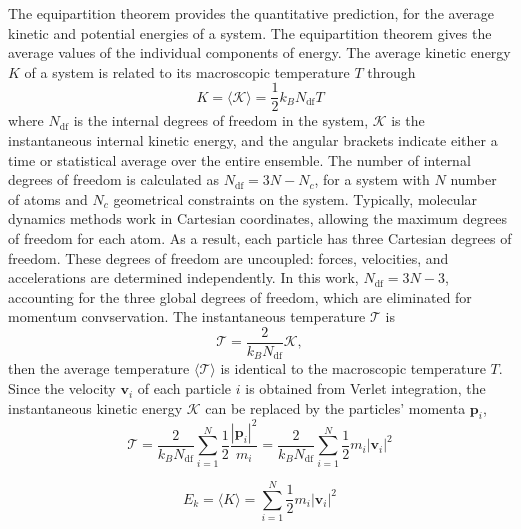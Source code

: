 The equipartition theorem provides the quantitative prediction, for the average kinetic and potential energies of a system.  The equipartition theorem gives the average values of the individual components of energy.  The average kinetic energy $K$ of a system is related to its macroscopic temperature $T$ through
\begin{equation}
  K
  =
  \langle \mathcal{K} \rangle
  =
  \frac{1}
       {2}
  k_B N_{\mathrm{df}} T
\end{equation}
where $N_{\mathrm{df}}$ is the internal degrees of freedom in the system, $\mathcal{K}$ is the instantaneous internal kinetic energy, and the angular brackets indicate either a time or statistical average over the entire ensemble.
The number of internal degrees of freedom is calculated as $N_{\mathrm{df}} = 3 N - N_c$, for a system with $N$ number of atoms and $N_c$ geometrical constraints on the system.  Typically, molecular dynamics methods work in Cartesian coordinates, allowing the maximum degrees of freedom for each atom. As a result, each particle has three Cartesian degrees of freedom.  These degrees of freedom are uncoupled: forces, velocities, and accelerations are determined independently.  In this work, $N_{\mathrm{df}} = 3N -3$, accounting for the three global degrees of freedom, which are eliminated for momentum convservation.
The instantaneous temperature $\mathcal{T}$ is
\begin{equation}
  \mathcal{T}
  =
  \frac{2}
       {k_B N_{\mathrm{df}}}
  \mathcal{K},
\end{equation}
then the average temperature $\langle\mathcal{T}\rangle$ is identical to the macroscopic temperature $T$.  Since the velocity $\bm{v}_i$ of each particle $i$ is obtained from Verlet integration, the instantaneous kinetic energy $\mathcal{K}$ can be replaced by the particles' momenta $\bm{p}_i$,
\begin{equation}
  \label{eq:T_kinetic_energy}
  \mathcal{T}
  = \frac{2}
         {k_B N_{\mathrm{df}}}
    \sum_{i=1}^N
		  \frac{1}{2}
		  \frac{|\bm{p}_i|^2}{m_i}
  = \frac{2}
         {k_B N_{\mathrm{df}}}
    \sum_{i=1}^N
		     \frac{1}{2} m_i |\bm{v}_i|^2
\end{equation}

\begin{equation}
  E_k
	= \langle K \rangle = \sum_{i=1}^N
	\frac{1}{2} m_i |\bm{v}_i|^2
\end{equation}


